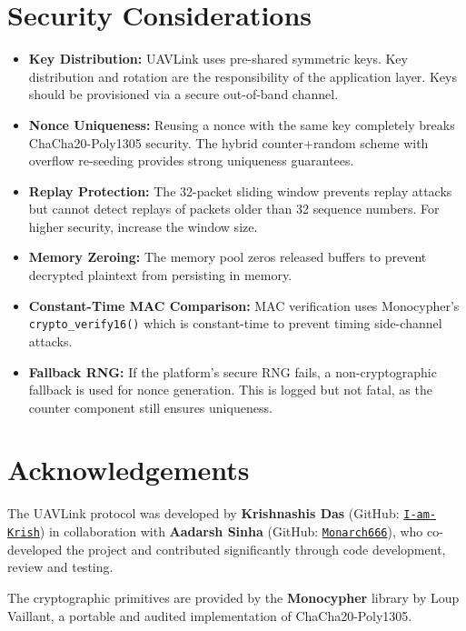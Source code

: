 \documentclass[11pt,a4paper]{article}
\begin{document}
\section{Security Considerations}

\begin{itemize}
    \item \textbf{Key Distribution:} UAVLink uses pre-shared symmetric keys. Key distribution and rotation are the responsibility of the application layer. Keys should be provisioned via a secure out-of-band channel.
    \item \textbf{Nonce Uniqueness:} Reusing a nonce with the same key completely breaks ChaCha20-Poly1305 security. The hybrid counter+random scheme with overflow re-seeding provides strong uniqueness guarantees.
    \item \textbf{Replay Protection:} The 32-packet sliding window prevents replay attacks but cannot detect replays of packets older than 32 sequence numbers. For higher security, increase the window size.
    \item \textbf{Memory Zeroing:} The memory pool zeros released buffers to prevent decrypted plaintext from persisting in memory.
    \item \textbf{Constant-Time MAC Comparison:} MAC verification uses Monocypher's \texttt{crypto\_verify16()} which is constant-time to prevent timing side-channel attacks.
    \item \textbf{Fallback RNG:} If the platform's secure RNG fails, a non-cryptographic fallback is used for nonce generation. This is logged but not fatal, as the counter component still ensures uniqueness.
\end{itemize}

\section{Acknowledgements}

The UAVLink protocol was developed by \textbf{Krishnashis Das} (GitHub: \href{https://github.com/I-am-Krish}{\texttt{I-am-Krish}}) in collaboration with \textbf{Aadarsh Sinha} (GitHub: \href{https://github.com/Monarch666}{\texttt{Monarch666}}), who co-developed the project and contributed significantly through code development, review and testing.

The cryptographic primitives are provided by the \textbf{Monocypher} library by Loup Vaillant, a portable and audited implementation of ChaCha20-Poly1305.
\end{document}
